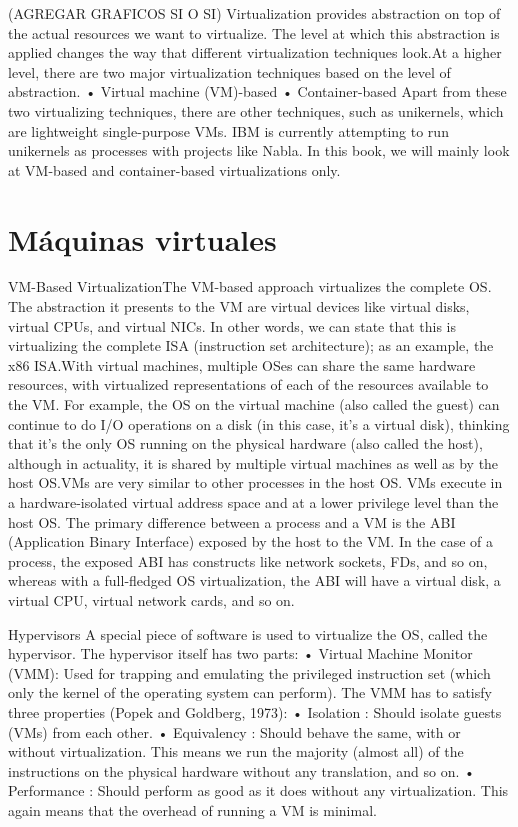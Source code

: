 

(AGREGAR GRAFICOS SI O SI)
Virtualization provides abstraction on top of the actual resources we want to virtualize.
 The level at which this abstraction is applied changes the way that different
  virtualization techniques look.At a higher level, there are two major
   virtualization techniques based on the level of abstraction.
   • Virtual machine (VM)-based
   • Container-based
   Apart from these two virtualizing techniques, there are other techniques, such as unikernels, which are lightweight single-purpose VMs. IBM is currently attempting to run unikernels as processes with projects like Nabla. In this book, we will mainly look at VM-based and container-based virtualizations only.
\section{Máquinas virtuales}
VM-Based  VirtualizationThe VM-based approach virtualizes the complete OS. The abstraction
 it presents to the VM are virtual devices like virtual disks, virtual CPUs, and virtual 
 NICs. In other words, we can state that this is virtualizing the complete ISA
  (instruction set architecture); as an example, the x86 ISA.With virtual machines,
   multiple OSes can share the same hardware resources, with virtualized representations 
   of each of the resources available to the VM. For example, the OS on the virtual
    machine (also called the guest) can continue to do I/O operations on a disk 
    (in this case, it’s a virtual disk), thinking that it’s the only OS running on the 
    physical hardware (also called the host), although in actuality, it is shared by 
    multiple virtual machines as well as by the host OS.VMs are very similar to other 
    processes in the host OS. VMs execute in a hardware-isolated virtual address space 
    and at a lower privilege level than the host OS. The primary difference between a
     process and a VM is the ABI (Application Binary Interface) exposed by the host
      to the VM. In the case of a process, the exposed ABI has constructs like network 
      sockets, FDs, and so on, whereas with a full-fledged OS virtualization, the ABI 
      will have a virtual disk, a virtual CPU, virtual network cards, and so on.

Hypervisors
A special piece of software is used to virtualize the OS, called the hypervisor. The 
hypervisor itself has two parts:
• Virtual Machine Monitor (VMM): Used for trapping and emulating the privileged 
instruction set (which only the kernel of the operating system can perform).
The VMM has to satisfy three properties (Popek and Goldberg, 1973):
    • Isolation :  
Should isolate guests (VMs) from each other.
    • Equivalency : Should behave the same, 
with or without virtualization. This means we run the majority (almost all) of the 
instructions on the physical hardware without any translation, and so on.
    • Performance : 
Should perform as good as it does without any virtualization. This again means that 
the overhead of running a VM is minimal.

